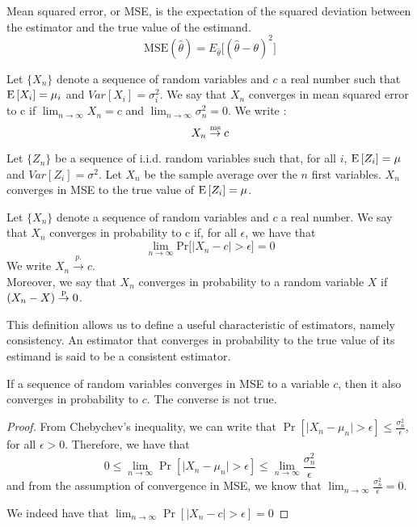 \begin{definition} 
Mean squared error, or MSE, is the expectation of the squared deviation between the estimator and the true value of the estimand. $$ \text{MSE}(\hat{\theta}) = E_{\hat{\theta}}\big[(\hat{\theta} - \theta)^2\big] $$
\end{definition} 

\begin{definition} 
Let $\{X_n\}$ denote a sequence of random variables and $c$ a real number such that $\operatorname{E}\left[X_i\right] = \mu_i$ and $Var[X_i] = \sigma_i^2$. We say that $X_n$ converges in mean squared error to c if $\lim_{n\to\infty} X_n = c$ and $\lim_{n\to\infty} \sigma_n^2 = 0$. We write : $$ X_n\overset{\text{ms}}{\to} c $$
\end{definition} 

\begin{remark} 
Let $\{Z_n\}$ be a sequence of i.i.d. random variables such that, for all $i$, $\operatorname{E}\left[Z_i\right] = \mu$ and $Var[Z_i] = \sigma^2$. Let $X_n$ be the sample average over the $n$ first variables. $X_n$ converges in MSE to the true value of $\operatorname{E}\left[Z_i\right] = \mu$.
\end{remark} 

\begin{definition} 
Let $\{X_n\}$ denote a sequence of random variables and $c$ a real number. We say that $X_n$ converges in probability to c if, for all $\epsilon$, we have that $$ \lim_{n\to\infty} \text{Pr}\big[\lvert X_n - c \rvert > \epsilon\big] = 0 $$
We write $ X_n \overset{p.}{\to} c $.\\
Moreover, we say that $X_n$ converges in probability to a random variable $X$ if $(X_n - X)\overset{\text{p}}{\to} 0$.
\end{definition}

This definition allows us to define a useful characteristic of estimators, namely consistency. An estimator that converges in probability to the true value of its estimand is said to be a consistent estimator.

\begin{remark} If a sequence of random variables converges in MSE to a variable $c$, then it also converges in probability to $c$. The converse is not true.
\end{remark}

\begin{proof}
From Chebychev's inequality, we can write that $ \operatorname{Pr}[\lvert X_n - \mu_n \rvert > \epsilon ] \leq \frac{\sigma_n^2}{\epsilon} $, for all $\epsilon >0$. Therefore, we have that $$0\leq \lim_{n\to\infty} \operatorname{Pr}[\lvert X_n - \mu_n \rvert > \epsilon] \leq \lim_{n\to\infty} \frac{\sigma_n^2}{\epsilon} $$ and from the assumption of convergence in MSE, we know that $\lim_{n\to\infty} \frac{\sigma_n^2}{\epsilon} = 0$.

We indeed have that $\lim_{n\to\infty} \operatorname{Pr}[\lvert X_n - c \rvert > \epsilon] = 0$
\end{proof}

